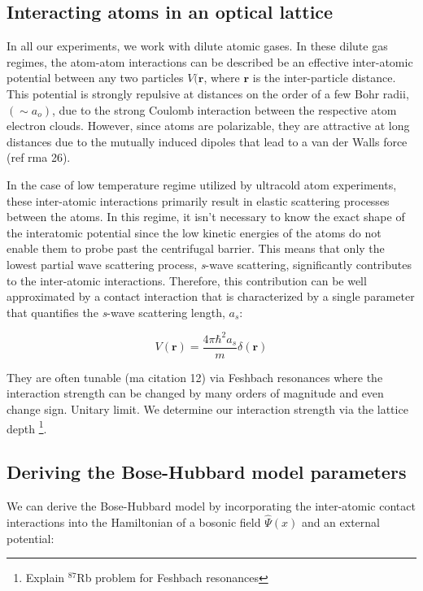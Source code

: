 \subsection{Interacting atoms in an optical lattice}

In all our experiments, we work with dilute atomic gases. In these dilute gas regimes, the atom-atom interactions can be described be an effective inter-atomic potential between any two particles  $V(\textbf{r}$, where $\textbf{r}$ is the inter-particle distance. This potential is strongly repulsive at distances on the order of a few Bohr radii, $(\sim a_o)$, due to the strong Coulomb interaction between the respective atom electron clouds. However, since atoms are polarizable, they are attractive at long distances due to the mutually induced dipoles that lead to a van der Walls force (ref rma 26). 

In the case of low temperature regime utilized by ultracold atom experiments, these inter-atomic interactions primarily result in elastic scattering processes between the atoms. In this regime, it isn't necessary to know the exact shape of the interatomic potential since the low kinetic energies of the atoms do not enable them to probe past the centrifugal barrier. This means that only the lowest partial wave scattering process, \emph{s}-wave scattering, significantly contributes to the inter-atomic interactions.  Therefore, this contribution can be well approximated by a contact interaction that is characterized by a single parameter that quantifies the \emph{s}-wave scattering length, $a_s$: 

\begin{equation}
\label{eqn:UCPot}
V(\textbf{r})=\frac{4 \pi \hbar^2 a_s}{m} \delta (\textbf{r})
\end{equation}

They are often tunable (ma citation 12) via Feshbach resonances where the interaction strength can be changed by many orders of magnitude and even change sign. Unitary limit. We determine our interaction strength via the lattice depth \footnote{Explain $^{87}$Rb problem for Feshbach resonances}.

\subsection{Deriving the Bose-Hubbard model parameters}

We can derive the Bose-Hubbard model by incorporating the inter-atomic contact interactions into the Hamiltonian of a bosonic field $\hat{\Psi}(x)$ and an external potential:

